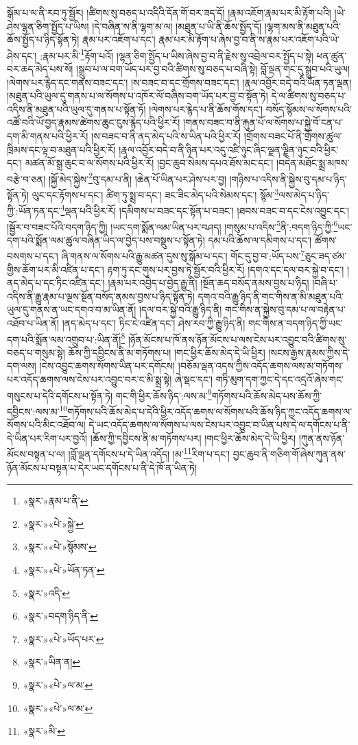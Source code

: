 སྒོམ་པ་ལ་ནི་རབ་ཏུ་སྦྱོར། །ཚིགས་སུ་བཅད་པ་འདིའི་དོན་གོ་བར་ཟད་དོ། །རྣམ་འཇོག་རྣམ་པར་མི་རྟོག་པའི། །ཡེ་ཤེས་ལྷན་ཅིག་སྤྱོད་པ་ཡིས། །དེ་བཞིན་ས་ནི་ལྷག་མ་ལ། །མཐུན་པ་ཡི་ནི་ཆོས་སྤྱོད་དོ། །ལྷག་མས་ནི་མཐུན་པའི་ཆོས་སྤྱོད་པ་ཉིད་སྟོན་ཏེ། རྣམ་པར་འཇོག་པ་དང་། རྣམ་པར་མི་རྟོག་པ་ཞེས་བྱ་བ་ནི་ས་རྣམ་པར་འཇོག་པའི་ཡེ་ཤེས་དང་། :རྣམ་པར་མི་\footnote{«སྣར་»རྣམ་པ་ནི་}རྟོག་པའོ། །ལྷན་ཅིག་སྤྱོད་པ་ཡིས་ཞེས་བྱ་བ་ནི་རྗེས་སུ་འབྲེལ་བར་སྤྱོད་པ་སྟེ། ཕན་ཚུན་བར་ཆད་མེད་པས་སོ། །སྒྲུབ་པ་ལ་བག་ཡོད་པར་བྱ་བའི་ཚིགས་སུ་བཅད་པ་བཞི་སྟེ། བློ་ལྡན་གང་དུ་སྒྲུབ་པའི་ཡུལ། །ལེགས་པར་རྙེད་དང་གནས་བཟང་དང་། །ས་བཟང་བ་དང་གྲོགས་བཟང་དང་། །རྣལ་འབྱོར་བདེ་བའི་ཡོན་ཏན་ལྡན། །མཐུན་པའི་ཡུལ་དུ་གནས་པ་ལ་སོགས་པ་འཁོར་ལོ་བཞིས་བག་ཡོད་པར་བྱ་བ་སྟོན་ཏེ། དེ་ལ་ཚིགས་སུ་བཅད་པ་འདིས་ནི་མཐུན་པའི་ཡུལ་དུ་གནས་པ་སྟོན་ཏོ། །ལེགས་པར་རྙེད་པ་ནི་ཆོས་གོས་དང་། བསོད་སྙོམས་ལ་སོགས་པའི་འཚོ་བའི་ཡོ་བྱད་རྣམས་ཚེགས་ཆུང་ངུས་རྙེད་པའི་ཕྱིར་རོ། །གནས་བཟང་བ་ནི་རྐུན་པོ་ལ་སོགས་པ་སྐྱེ་བོ་ངན་པ་དག་མི་གནས་པའི་ཕྱིར་རོ། །ས་བཟང་བ་ནི་ནད་མེད་པའི་ས་ཡིན་པའི་ཕྱིར་རོ། །གྲོགས་བཟང་པོ་ནི་གྲོགས་ཚུལ་ཁྲིམས་དང་ལྟ་བ་མཐུན་པའི་ཕྱིར་རོ། །རྣལ་འབྱོར་བདེ་བ་ནི་ཉིན་པར་འདུ་འཛི་ཉུང་ཞིང་ལྗན་ལྗིན་ཉུང་བའི་ཕྱིར་དང་། མཚན་མོ་སྒྲ་ཆུང་བ་ལ་སོགས་པའི་ཕྱིར་རོ། །བྱང་ཆུབ་སེམས་དཔའ་ཐོས་མང་དང་། །བདེན་མཐོང་སྨྲ་མཁས་བརྩེ་བ་ཅན། །སྐྱོ་མེད་སྐྱེས་\footnote{«སྣར་»«པེ་»སྐྱེ་}བུ་དམ་པ་ནི། །ཆེན་པོ་ཡིན་པར་ཤེས་པར་བྱ། །གཉིས་པ་འདིས་ནི་སྐྱེས་བུ་དམ་པ་ཉིད་སྟོན་ཏེ། ལུང་དང་རྟོགས་པ་དང་། ཚིག་ཏུ་སྨྲ་བ་དང་། ཟང་ཟིང་མེད་པའི་སེམས་དང་། སྙོམ་\footnote{«སྣར་»«པེ་»སྙོམས་}ལས་མེད་པ་ཉིད་ཀྱི་:ཡོན་ཏན་དང་\footnote{«སྣར་»«པེ་»ཡོན་ཏན་}ལྡན་པའི་ཕྱིར་རོ། །དམིགས་པ་བཟང་དང་སྟོན་པ་བཟང་། །ཐབས་བཟང་བ་དང་ངེས་འབྱུང་དང་། །སྦྱོར་བ་བཟང་པོའི་བདག་ཉིད་ཀྱི། །ཡང་དག་སྨོན་ལམ་ཡིན་པར་བཤད། །གསུམ་པ་འདིས་\footnote{«སྣར་»འདི་}ནི་:བདག་ཉིད་ཀྱི་\footnote{«སྣར་»བདག་ཉིད་ནི་}ཡང་དག་པའི་སྨོན་ལམ་ཚུལ་བཞིན་ཡིད་ལ་བྱེད་པས་བསྡུས་པ་སྟོན་ཏེ། དམ་པའི་ཆོས་ལ་དམིགས་པ་དང་། ཚོགས་བསགས་པ་དང་། ཞི་གནས་ལ་སོགས་པའི་རྒྱུ་མཚན་དུས་སུ་སྒོམ་པ་དང་། གོང་དུ་བྱ་བ་:ཡོད་པས་\footnote{«སྣར་»«པེ་»ཡོད་པར་}ཅུང་ཟད་ཙམ་གྱིས་ཆོག་པར་མི་འཛིན་པ་དང་། རྟག་ཏུ་དང་གུས་པར་བྱས་ཏེ་སྦྱོར་བའི་ཕྱིར་རོ། །དགའ་དང་དལ་བར་སྐྱེ་བ་དང་། །ནད་མེད་པ་དང་ཏིང་འཛིན་དང་། །རྣམ་པར་འབྱེད་པ་བྱེད་རྒྱུ་ནི། །སྔོན་ཆད་བསོད་ནམས་བྱས་པ་ཉིད། །བཞི་པ་འདིས་ནི་རྒྱུ་རྣམ་པ་ལྔས་སྔོན་བསོད་ནམས་བྱས་པ་ཉིད་སྟོན་ཏེ། དགའ་བའི་རྒྱུ་ཉིད་ནི་གང་གིས་ན་མི་མཐུན་པའི་ཡུལ་དུ་གནས་ན་ཡང་དགའ་བ་མ་ཡིན་ནོ། །དལ་བར་སྐྱེ་བའི་རྒྱུ་ཉིད་ནི། གང་གིས་ན་སྐྱེས་བུ་དམ་པ་ལ་བརྟེན་པ་འཐོབ་པ་ཡིན་ནོ། །ནད་མེད་པ་དང་། ཏིང་ངེ་འཛིན་དང་། ཤེས་རབ་ཀྱི་རྒྱུ་ཉིད་ནི། གང་གིས་ན་བདག་ཉིད་ཀྱི་ཡང་དག་པའི་སྨོན་ལམ་འགྲུབ་པ་:ཡིན་ནོ།\footnote{«སྣར་»ཡིན་ན།} །ཉོན་མོངས་པ་ཁོ་ནས་ཉོན་མོངས་པ་ལས་ངེས་པར་འབྱུང་བའི་ཚིགས་སུ་བཅད་པ་གསུམ་སྟེ། ཆོས་ཀྱི་དབྱིངས་ནི་མ་གཏོགས་པ། །གང་ཕྱིར་ཆོས་མེད་དེ་ཡི་ཕྱིར། །སངས་རྒྱས་རྣམས་ཀྱིས་དེ་དག་ལས། །ངེས་འབྱུང་ཆགས་སོགས་ཡིན་པར་དགོངས། །བཅོམ་ལྡན་འདས་ཀྱིས་འདོད་ཆགས་ལས་མ་གཏོགས་པར་འདོད་ཆགས་ལས་ངེས་པར་འབྱུང་བར་ང་མི་སྨྲ་སྟེ། ཞེ་སྡང་དང་། གཏི་མུག་དག་ཀྱང་དེ་དང་འདྲའོ་ཞེས་གང་གསུངས་པ་དེའི་དགོངས་པ་སྟོན་ཏེ། གང་གི་ཕྱིར་ཆོས་ཉིད་:ལས་མ་\footnote{«སྣར་»«པེ་»ལ་མ་}གཏོགས་པའི་ཆོས་མེད་པས་ཆོས་ཀྱི་དབྱིངས་:ལས་མ་\footnote{«སྣར་»«པེ་»ལ་མ་}གཏོགས་པའི་ཆོས་མེད་པ་དེའི་ཕྱིར་འདོད་ཆགས་ལ་སོགས་པའི་ཆོས་ཉིད་ཀྱང་འདོད་ཆགས་ལ་སོགས་པའི་མིང་འཐོབ་ལ། དེ་ཡང་འདོད་ཆགས་ལ་སོགས་པ་ལས་ངེས་པར་འབྱུང་བ་ཡིན་པས་དེ་ལ་དགོངས་པ་ནི་དེ་ཡིན་པར་རིག་པར་བྱའོ། །ཆོས་ཀྱི་དབྱིངས་ནི་མ་གཏོགས་པར། །གང་ཕྱིར་ཆོས་མེད་དེ་ཡི་ཕྱིར། །ཀུན་ནས་ཉོན་མོངས་བསྟན་པ་ལ། །བློ་ལྡན་དགོངས་པ་དེ་ཡིན་འདོད། །མ་\footnote{«སྣར་»མི་}རིག་པ་དང་། བྱང་ཆུབ་ནི་གཅིག་གོ་ཞེས་ཀུན་ནས་ཉོན་མོངས་པ་བསྟན་པ་དེར་ཡང་དགོངས་པ་ནི་དེ་ཁོ་ན་ཡིན་ཏེ། 